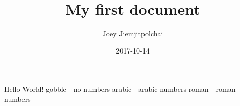 \documentclass{article}
\title{My first document}
\date{2017-10-14}
\author{Joey Jiemjitpolchai}
\begin{document}
    \maketitle
    \newpage
    
	Hello World!
	gobble - no numbers
    arabic - arabic numbers
    roman - roman numbers
\end{document}
